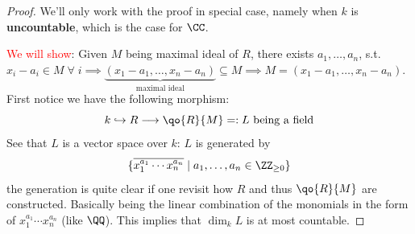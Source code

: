 \begin{proof}
	We'll only work with the proof in special case, namely when \( k \) is \textbf{uncountable}, which
	is the case for \( \CC \).

	\textcolor{red}{We will show}: Given \( M \) being maximal ideal of \( R \), there exists \( a_1,\ldots, a_n \), s.t. \( x_i -
	a_i \in M \; \forall \; i \implies \underbrace{(x_1-a_1, \ldots, x_n-a_n)}_{\text{maximal ideal}}
	\subseteq M \implies M = (x_1 - a_1, \ldots, x_n - a_n)\). First notice we have the following
	morphism:
	\[
		k \hookrightarrow R \longrightarrow \qo{R}{M} =: L \text{ being a field}
	\]
	See that \( L \) is a vector space over \( k \): \( L \) is generated by
	\[
		\{\overline{x_1^{a_1}\cdots x_n^{a_n}} \; | \; a_1, \ldots, a_n \in \ZZ_{\geq 0}\}
	\]
	the generation is quite clear if one revisit how \( R \) and thus \( \qo{R}{M} \) are constructed.
	Basically being the linear combination of the monomials in the form of \( x_1^{a_1}\cdots x_n^{a_n}
	\) (like $\QQ$). This implies that \( \dim_{k} L \) is at most countable.


\end{proof}
